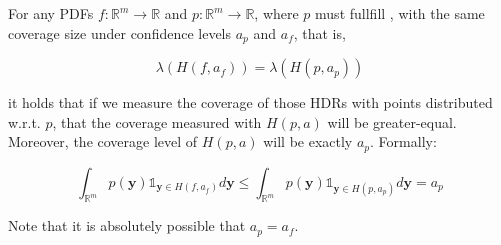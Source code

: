 \begin{lemma}\label{lem:hdr_optimality_mll}
    For any PDFs $f: \mathbb{R}^m \to \mathbb{R}$ and $p: \mathbb{R}^m \to \mathbb{R}$, where $p$ must fullfill , with the same coverage size under confidence levels $a_p$ and $a_f$, that is,

    \[\lambda(H(f, a_f)) = \lambda(H(p,a_p))\]

    it holds that if we measure the coverage of those HDRs with points distributed w.r.t. $p$, that the coverage measured with $H(p,a)$ will be greater-equal. Moreover, the coverage level of $H(p,a)$ will be exactly $a_p$. Formally:

    \[
        \int_{\mathbb{R}^{m}} p(\mathbf{y}) \mathds1_{\mathbf{y} \in H(f, a_f)} d
        \mathbf{y} \leq \int_{\mathbb{R}^{m}} p(\mathbf{y})
        \mathds1_{\mathbf{y} \in
            H(p, a_p)} d \mathbf{y} = a_p
    \]
\end{lemma}
Note that it is absolutely possible that $a_p = a_f$.
